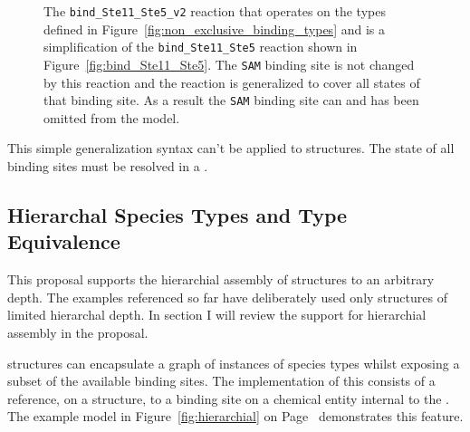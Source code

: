 \documentclass{cekarticle}
\begin{document}
\begin{figure}[h]
  \caption{
  The \texttt{bind\_Ste11\_Ste5\_v2} reaction that operates on the types defined in
  Figure~\ref{fig:non_exclusive_binding_types} and is a simplification of the \texttt{bind\_Ste11\_Ste5}
  reaction shown in Figure~\ref{fig:bind_Ste11_Ste5}. The \texttt{SAM} binding site is not changed by
  this reaction and the reaction is generalized to cover all states of that binding site.  As a result
  the
  \texttt{SAM}
  binding site
  can and
  has been omitted from the model.}

  \label{fig:bind_Ste11_Ste5_v2}
\end{figure}

This simple generalization syntax can't be applied to  structures.
The state of all binding sites must be resolved in a .

\subsection{Hierarchal Species Types and Type Equivalence}

This proposal supports the hierarchial assembly of  structures to an arbitrary depth.
The examples referenced so far have deliberately used only structures of limited hierarchal depth.  In
section I will review the support for hierarchial assembly in the proposal.

 structures can encapsulate a graph of instances of species types whilst exposing
a subset of the available binding sites.  The implementation of this consists of a reference,
on a  structure, to a binding site on a chemical entity internal to the
.  The example model in Figure~\ref{fig:hierarchial} on Page~\pageref{fig:hierarchial}
demonstrates this feature.
\end{document}
